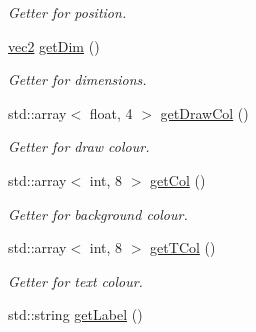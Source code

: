 \begin{DoxyCompactItemize}
\begin{DoxyCompactList}\small\item\em Getter for position. \end{DoxyCompactList}\item 
\hypertarget{classui_1_1button_ae2d328b1a97d25cf1379c7b2fd01d2f1}{\hyperlink{structvec2}{vec2} \hyperlink{classui_1_1button_ae2d328b1a97d25cf1379c7b2fd01d2f1}{get\-Dim} ()}\label{classui_1_1button_ae2d328b1a97d25cf1379c7b2fd01d2f1}

\begin{DoxyCompactList}\small\item\em Getter for dimensions. \end{DoxyCompactList}\item 
\hypertarget{classui_1_1button_ab8b1a929809c025152fd3151cb6725a3}{std\-::array$<$ float, 4 $>$ \hyperlink{classui_1_1button_ab8b1a929809c025152fd3151cb6725a3}{get\-Draw\-Col} ()}\label{classui_1_1button_ab8b1a929809c025152fd3151cb6725a3}

\begin{DoxyCompactList}\small\item\em Getter for draw colour. \end{DoxyCompactList}\item 
\hypertarget{classui_1_1button_a703993eaab990656c3eaafb7d1aab8ce}{std\-::array$<$ int, 8 $>$ \hyperlink{classui_1_1button_a703993eaab990656c3eaafb7d1aab8ce}{get\-Col} ()}\label{classui_1_1button_a703993eaab990656c3eaafb7d1aab8ce}

\begin{DoxyCompactList}\small\item\em Getter for background colour. \end{DoxyCompactList}\item 
\hypertarget{classui_1_1button_a77e6e79bf186ea33bc0f7d1b7b88ba71}{std\-::array$<$ int, 8 $>$ \hyperlink{classui_1_1button_a77e6e79bf186ea33bc0f7d1b7b88ba71}{get\-T\-Col} ()}\label{classui_1_1button_a77e6e79bf186ea33bc0f7d1b7b88ba71}

\begin{DoxyCompactList}\small\item\em Getter for text colour. \end{DoxyCompactList}\item 
\hypertarget{classui_1_1button_aafa157c40fcc2c7eda8162d9ca2c672d}{std\-::string \hyperlink{classui_1_1button_aafa157c40fcc2c7eda8162d9ca2c672d}{get\-Label} ()}\label{classui_1_1button_aafa157c40fcc2c7eda8162d9ca2c672d}


\end{DoxyCompactItemize}
